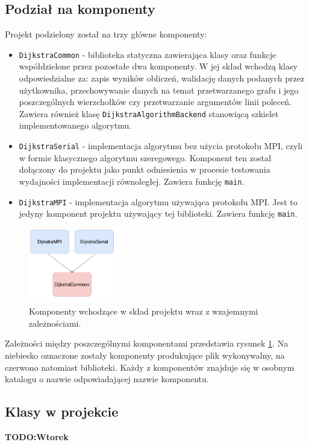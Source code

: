 \documentclass[12pt]{article}
\begin{document}
\subsection{Podział na komponenty}
Projekt podzielony został na trzy główne komponenty:
\begin{itemize}
\item \lstinline{DijkstraCommon} - biblioteka statyczna zawierająca klasy oraz funkcje współdzielone przez pozostałe dwa komponenty. W jej skład wchodzą klasy odpowiedzialne za: zapis wyników obliczeń, walidację danych podanych przez użytkownika, przechowywanie danych na temat przetwarzanego grafu i jego poszczególnych wierzchołków czy przetwarzanie argumentów linii poleceń. Zawiera również klasę \lstinline{DijkstraAlgorithmBackend} stanowiącą szkielet implementowanego algorytmu.
\item \lstinline{DijkstraSerial} - implementacja algorytmu bez użycia protokołu MPI, czyli w formie klasycznego algorytmu szeregowego. Komponent ten został dołączony do projektu jako punkt odniesienia w procesie testowania wydajności implementacji równoległej. Zawiera funkcję \lstinline{main}.
\item \lstinline{DijkstraMPI} - implementacja algorytmu używająca protokołu MPI. Jest to jedyny komponent projektu używający tej biblioteki. Zawiera funkcję \lstinline{main}.
\end{itemize}
\begin{figure}[H]
\centering
\includegraphics[width=0.35\textwidth]{static/DijkstraArch1.pdf}
\caption{Komponenty wchodzące w skład projektu wraz z wzajemnymi zależnościami.}
\label{fig:arch1}
\end{figure}

Zależności między poszczególnymi komponentami przedstawia rysunek \ref{fig:arch1}. Na niebiesko oznaczone zostały komponenty produkujące plik wykonywalny, na czerwono natomiast biblioteki. Każdy z komponentów znajduje się w osobnym katalogu o nazwie odpowiadającej nazwie komponentu.


\subsection{Klasy w projekcie}
\textbf{TODO:Wtorek}
\end{document}
